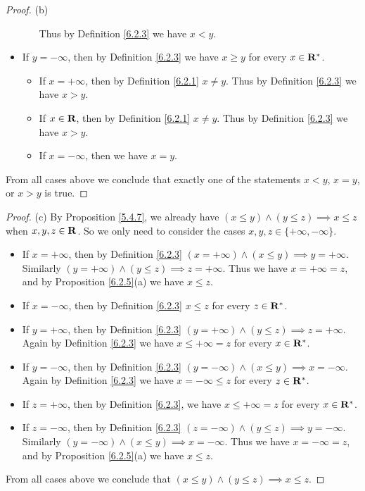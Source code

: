 \begin{proof}{(b)}
\begin{itemize}
\begin{itemize}
                        Thus by Definition \ref{6.2.3} we have \(x < y\).
              \end{itemize}
        \item If \(y = -\infty\), then by Definition \ref{6.2.3} we have \(x \geq y\) for every \(x \in \mathbf{R}^*\).
              \begin{itemize}
                  \item If \(x = +\infty\), then by Definition \ref{6.2.1} \(x \neq y\).
                        Thus by Definition \ref{6.2.3} we have \(x > y\).
                  \item If \(x \in \mathbf{R}\), then by Definition \ref{6.2.1} \(x \neq y\).
                        Thus by Definition \ref{6.2.3} we have \(x > y\).
                  \item If \(x = -\infty\), then we have \(x = y\).
              \end{itemize}
    \end{itemize}
    From all cases above we conclude that exactly one of the statements \(x < y\), \(x = y\), or \(x > y\) is true.
\end{proof}

\begin{proof}{(c)}
    By Proposition \ref{5.4.7}, we already have \((x \leq y) \land (y \leq z) \implies x \leq z\) when \(x, y, z \in \mathbf{R}\).
    So we only need to consider the cases \(x, y, z \in \{+\infty, -\infty\}\).
    \begin{itemize}
        \item If \(x = +\infty\), then by Definition \ref{6.2.3} \((x = +\infty) \land (x \leq y) \implies y = +\infty\).
              Similarly \((y = +\infty) \land (y \leq z) \implies z = +\infty\).
              Thus we have \(x = +\infty = z\), and by Proposition \ref{6.2.5}(a) we have \(x \leq z\).
        \item If \(x = -\infty\), then by Definition \ref{6.2.3} \(x \leq z \) for every \(z \in \mathbf{R}^*\).
        \item If \(y = +\infty\), then by Definition \ref{6.2.3} \((y = +\infty) \land (y \leq z) \implies z = +\infty\).
              Again by Definition \ref{6.2.3} we have \(x \leq +\infty = z\) for every \(x \in \mathbf{R}^*\).
        \item If \(y = -\infty\), then by Definition \ref{6.2.3} \((y = -\infty) \land (x \leq y) \implies x = -\infty\).
              Again by Definition \ref{6.2.3} we have \(x = -\infty \leq z\) for every \(z \in \mathbf{R}^*\).
        \item If \(z = +\infty\), then by Definition \ref{6.2.3}, we have \(x \leq +\infty = z\) for every \(x \in \mathbf{R}^*\).
        \item If \(z = -\infty\), then by Definition \ref{6.2.3} \((z = -\infty) \land (y \leq z) \implies y = -\infty\).
              Similarly \((y = -\infty) \land (x \leq y) \implies x = -\infty\).
              Thus we have \(x = -\infty = z\), and by Proposition \ref{6.2.5}(a) we have \(x \leq z\).
    \end{itemize}
    From all cases above we conclude that \((x \leq y) \land (y \leq z) \implies x \leq z\).
\end{proof}


